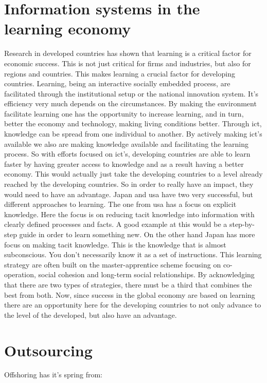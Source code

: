 \section{Information systems in the learning economy}
\label{infolearnec}
Research in developed countries has shown that learning is a critical factor for economic success.
This is not just critical for firms and industries, but also for regions and countries.
This makes learning a crucial factor for developing countries. 
Learning, being an interactive socially embedded process, are facilitated through the institutional setup or the national innovation system. It's efficiency very much depends on the circumstances.
By making the environment facilitate learning one has the opportunity to increase learning, and in turn, better the economy and technology, making living conditions better. 
Through \gls{ict}, knowledge can be spread from one individual to another. 
By actively making \gls{ict}'s available we also are making knowledge available and facilitating the learning process. 
So with efforts focused on \gls{ict}'s, developing countries are able to learn faster by having greater access to knowledge and as a result having a better economy.
This would actually just take the developing countries to a level already reached by the developing countries. So in order to really have an impact, they would need to have an advantage. 
Japan and \gls{usa} have two very successful, but different approaches to learning. 
The one from \gls{usa} has a focus on explicit knowledge. Here the focus is on reducing tacit knowledge into information with clearly defined processes and facts. A good example at this would be a step-by-step guide in order to learn something new. 
On the other hand Japan has more focus on making tacit knowledge. This is the knowledge that is almost subconscious. You don't necessarily know it as a set of instructions. This learning strategy are often built on the master-apprentice scheme focusing on co-operation, social cohesion and long-term social relationships. 
By acknowledging that there are two types of strategies, there must be a third that combines the best from both. 
Now, since success in the global economy are based on learning there are an opportunity here for the developing countries to not only advance to the level of the developed, but also have an advantage. 

\cite{gedi:erik}

\section{Outsourcing}
Offshoring has it's spring from:

